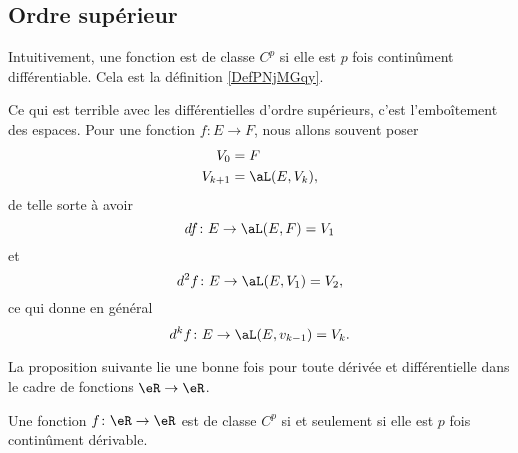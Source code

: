 \subsection{Ordre supérieur}

Intuitivement, une fonction est de classe \( C^p\) si elle est \( p\) fois continûment différentiable. Cela est la définition \ref{DefPNjMGqy}.


Ce qui est terrible avec les différentielles d'ordre supérieurs, c'est l'emboîtement des espaces. Pour une fonction \( f\colon E\to F\), nous allons souvent poser
\begin{subequations}
	\begin{align}
		V_0     & =F           \\
		V_{k+1} & =\aL(E,V_k),
	\end{align}
\end{subequations}
de telle sorte à avoir
\begin{equation}
	df\colon E\to \aL(E,F)=V_1
\end{equation}
et
\begin{equation}
	d^2f\colon E\to \aL(E,V_1)=V_2,
\end{equation}
ce qui donne en général
\begin{equation}
	d^kf\colon E\to \aL(E,v_{k-1})=V_k.
\end{equation}

La proposition suivante lie une bonne fois pour toute dérivée et différentielle dans le cadre de fonctions \( \eR\to \eR\).
\begin{proposition}      \label{PROPooCNDHooKRwils}
	Une fonction \( f\colon \eR\to \eR\) est de classe \( C^p\) si et seulement si elle est \( p\) fois continûment dérivable.
\end{proposition}

